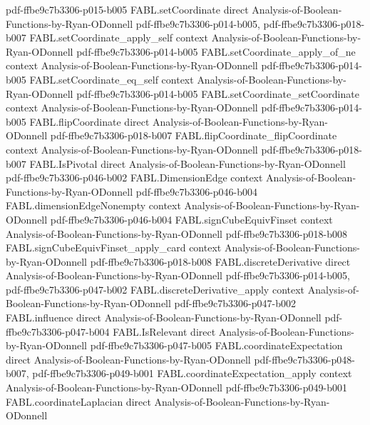 \begin{theorem}
  {pdf-ffbe9c7b3306-p015-b005}
\proofstep
  {FABL.setCoordinate}
  {direct}
  {Analysis-of-Boolean-Functions-by-Ryan-ODonnell}
  {pdf-ffbe9c7b3306-p014-b005,
    pdf-ffbe9c7b3306-p018-b007}
\proofstep
  {FABL.setCoordinate_apply_self}
  {context}
  {Analysis-of-Boolean-Functions-by-Ryan-ODonnell}
  {pdf-ffbe9c7b3306-p014-b005}
\proofstep
  {FABL.setCoordinate_apply_of_ne}
  {context}
  {Analysis-of-Boolean-Functions-by-Ryan-ODonnell}
  {pdf-ffbe9c7b3306-p014-b005}
\proofstep
  {FABL.setCoordinate_eq_self}
  {context}
  {Analysis-of-Boolean-Functions-by-Ryan-ODonnell}
  {pdf-ffbe9c7b3306-p014-b005}
\proofstep
  {FABL.setCoordinate_setCoordinate}
  {context}
  {Analysis-of-Boolean-Functions-by-Ryan-ODonnell}
  {pdf-ffbe9c7b3306-p014-b005}
\proofstep
  {FABL.flipCoordinate}
  {direct}
  {Analysis-of-Boolean-Functions-by-Ryan-ODonnell}
  {pdf-ffbe9c7b3306-p018-b007}
\proofstep
  {FABL.flipCoordinate_flipCoordinate}
  {context}
  {Analysis-of-Boolean-Functions-by-Ryan-ODonnell}
  {pdf-ffbe9c7b3306-p018-b007}
\proofstep
  {FABL.IsPivotal}
  {direct}
  {Analysis-of-Boolean-Functions-by-Ryan-ODonnell}
  {pdf-ffbe9c7b3306-p046-b002}
\proofstep
  {FABL.DimensionEdge}
  {context}
  {Analysis-of-Boolean-Functions-by-Ryan-ODonnell}
  {pdf-ffbe9c7b3306-p046-b004}
\proofstep
  {FABL.dimensionEdgeNonempty}
  {context}
  {Analysis-of-Boolean-Functions-by-Ryan-ODonnell}
  {pdf-ffbe9c7b3306-p046-b004}
\proofstep
  {FABL.signCubeEquivFinset}
  {context}
  {Analysis-of-Boolean-Functions-by-Ryan-ODonnell}
  {pdf-ffbe9c7b3306-p018-b008}
\proofstep
  {FABL.signCubeEquivFinset_apply_card}
  {context}
  {Analysis-of-Boolean-Functions-by-Ryan-ODonnell}
  {pdf-ffbe9c7b3306-p018-b008}
\proofstep
  {FABL.discreteDerivative}
  {direct}
  {Analysis-of-Boolean-Functions-by-Ryan-ODonnell}
  {pdf-ffbe9c7b3306-p014-b005,
    pdf-ffbe9c7b3306-p047-b002}
\proofstep
  {FABL.discreteDerivative_apply}
  {context}
  {Analysis-of-Boolean-Functions-by-Ryan-ODonnell}
  {pdf-ffbe9c7b3306-p047-b002}
\proofstep
  {FABL.influence}
  {direct}
  {Analysis-of-Boolean-Functions-by-Ryan-ODonnell}
  {pdf-ffbe9c7b3306-p047-b004}
\proofstep
  {FABL.IsRelevant}
  {direct}
  {Analysis-of-Boolean-Functions-by-Ryan-ODonnell}
  {pdf-ffbe9c7b3306-p047-b005}
\proofstep
  {FABL.coordinateExpectation}
  {direct}
  {Analysis-of-Boolean-Functions-by-Ryan-ODonnell}
  {pdf-ffbe9c7b3306-p048-b007,
    pdf-ffbe9c7b3306-p049-b001}
\proofstep
  {FABL.coordinateExpectation_apply}
  {context}
  {Analysis-of-Boolean-Functions-by-Ryan-ODonnell}
  {pdf-ffbe9c7b3306-p049-b001}
\proofstep
  {FABL.coordinateLaplacian}
  {direct}
  {Analysis-of-Boolean-Functions-by-Ryan-ODonnell}

\end{theorem}
